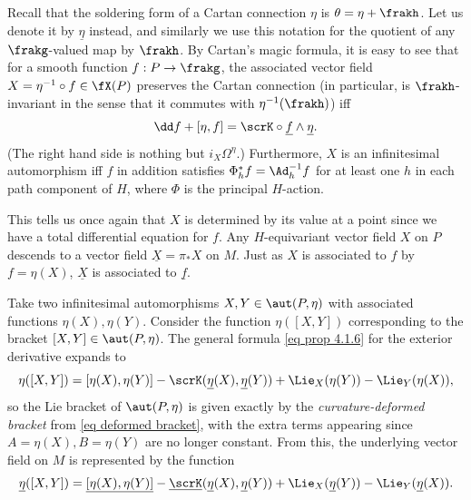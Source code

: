 Recall that the soldering form of a Cartan connection $\eta$ is $\theta=\eta+\frakh$. Let us denote it by $\underline{\eta}$ instead, and similarly we use this notation for the quotient of any $\frakg$-valued map by $\frakh$. By Cartan's magic formula, it is easy to see that for a smooth function $f:P\to \frakg$, the associated vector field $X=\eta^{-1}\circ f\in \fX(P)$ preserves the Cartan connection (in particular, is $\frakh$-invariant in the sense that it commutes with $\eta^{-1}(\frakh)$) iff 
\[\dd f+[\eta,f]=\scrK\circ \underline{f}\wedge\underline{\eta}.\]
(The right hand side is nothing but $i_X \Omega^\eta$.) Furthermore, $X$ is an infinitesimal automorphism iff $f$ in addition satisfies $\Phi_h^\ast f=\Ad_h^{-1}f$ for at least one $h$ in each path component of $H$, where $\Phi$ is the principal $H$-action.

This tells us once again that $X$ is determined by its value at a point since we have a total differential equation for $f$. Any $H$-equivariant vector field $X$ on $P$ descends to a vector field $\underline{X}=\pi_\ast X$ on $M$. Just as $X$ is associated to $f$ by $f=\eta(X)$, $\underline{X}$ is associated to $\underline{f}$.

Take two infinitesimal automorphisms $X,Y\in\aut(P,\eta)$ with associated functions $\eta(X),\eta(Y)$. Consider the function $\eta([X,Y])$ corresponding to the bracket $[X,Y]\in \aut(P,\eta)$. The general formula \eqref{eq prop 4.1.6} for the exterior derivative expands to 
\[\eta([X,Y])=[\eta(X),\eta(Y)]-\scrK(\underline{\eta}(X),\underline{\eta}(Y))+\Lie_X (\eta(Y))-\Lie_{Y}(\eta(X)),\]
 so the Lie bracket of $\aut(P,\eta)$ is given exactly by the \emph{curvature-deformed bracket} from \eqref{eq deformed bracket}, with the extra terms appearing since $A=\eta(X),B=\eta(Y)$ are no longer constant. From this, the underlying vector field on $M$ is represented by the function
\[\underline{\eta}([X,Y])=\underline{[\eta(X),\eta(Y)]}-\underline{\scrK}(\underline{\eta}(X),\underline{\eta}(Y))+\Lie_X (\underline{\eta}(Y))-\Lie_Y (\underline{\eta}(X)).\]

